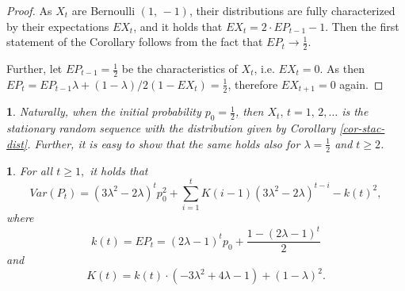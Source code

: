 \documentclass{amsart}
\theoremstyle{definition}
\theoremstyle{plain}
\newtheorem{prop}[thm]{\protect\propositionname}
\theoremstyle{plain}
\theoremstyle{plain}
\newtheorem{rem}[thm]{\protect\remarkname}
\numberwithin{equation}{section}
\providecommand{\propositionname}{Proposition}
\providecommand{\remarkname}{Remark}
\begin{document}
\begin{proof}
As $X_t$ are Bernoulli $(1,\,-1)$, their distributions are fully characterized by their expectations $EX_t$, and it holds that
$EX_t=2\cdot EP_{t-1}-1$. Then the first statement of the Corollary follows from the fact that $EP_t\to \frac{1}{2}.$

Further, let $EP_{t-1}=\frac{1}{2}$ be the characteristics of $X_t$, i.e.
$EX_t=0$. As then
$EP_t=EP_{t-1}\lambda+(1-\lambda)/2(1-EX_t)=\frac{1}{2}$, therefore $EX_{t+1}=0$ again.

\end{proof}

\begin{rem}
Naturally, when the initial probability
$p_0=\frac{1}{2}$, then $X_t,\,t=1,\,2,\dots$ is the stationary
random sequence with the distribution given by Corollary
\ref{cor-stac-dist}. Further, it is easy to show that the same holds also for $\lambda = \frac{1}{2}$ and $t\ge2$.
\end{rem}

\begin{prop}
\label{PropVarP-succes}For all $t\geq1,$ it holds that
\begin{equation}
Var(P_{t})=(3\lambda^{2}-2\lambda)^{t}p_{0}^{2}+\sum_{i=1}^{t}K(i-1)(3\lambda^{2}-2\lambda)^{t-i}-k(t)^{2},\label{eq:VarP-proposition}
\end{equation}
 where
\[
k(t)=EP_{t}=(2\lambda-1)^{t}p_{0}+\frac{1-(2\lambda-1)^{t}}{2}
\]
 and
\[
K(t)=k(t)\cdot(-3\lambda^{2}+4\lambda-1)+(1-\lambda)^{2}.
\]
\end{prop}
\end{document}

